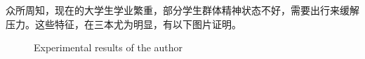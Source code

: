 \documentclass[a4paper,12pt]{article}
\begin{document}
  众所周知，现在的大学生学业繁重，部分学生群体精神状态不好，需要出行来缓解压力。这些特征，在三本尤为明显，有以下图片证明。
  \begin{figure}[htbp]
    \centering
    \quad
    
    \caption{Experimental results of the author}
    \end{figure}
\end{document}
